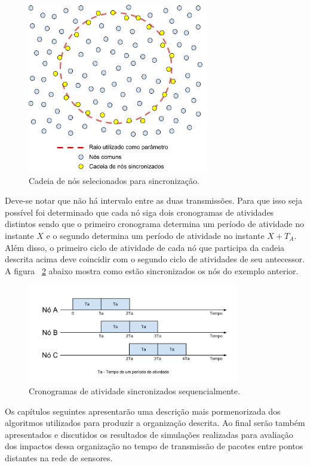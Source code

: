 \begin{figure}[!htb]
\centering
\includegraphics[width=297px,height=280px]{./Pictures/CircularBackbone.png}
\caption{Cadeia de nós selecionados para sincronização.} %
\label{fig:circularBackbone} %
\end{figure}

Deve-se notar que não há intervalo entre as duas transmissões. Para que isso seja possível foi determinado que cada nó siga dois cronogramas de atividades distintos sendo que o primeiro cronograma determina um período de atividade no instante $X$ e o segundo determina um período de atividade no instante $X + T_A$. Além disso, o primeiro ciclo de atividade de cada nó que participa da cadeia descrita acima deve coincidir com o segundo ciclo de atividades de seu antecessor. A figura ~\ref{fig:backboneSynchronization} abaixo mostra como estão sincronizados os nós do exemplo anterior.

\begin{figure}[!htb]
\centering
\includegraphics[width=350px,height=163px]{./Pictures/SequencialSynchronization.png}
\caption{Cronogramas de atividade sincronizados sequencialmente.} %
\label{fig:backboneSynchronization} %
\end{figure}

Os capítulos seguintes apresentarão uma descrição mais pormenorizada dos algoritmos utilizados para produzir a organização descrita. Ao final serão também apresentados e discutidos os resultados de simulações realizadas para avaliação dos impactos dessa organização no tempo de transmissão de pacotes entre pontos distantes na rede de sensores.

